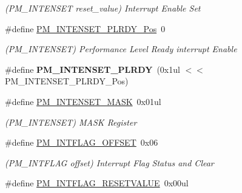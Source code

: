 \begin{DoxyCompactItemize}
\begin{DoxyCompactList}\small\item\em (P\+M\+\_\+\+I\+N\+T\+E\+N\+S\+E\+T reset\+\_\+value) Interrupt Enable Set \end{DoxyCompactList}\item 
\hypertarget{group___s_a_m_l21___p_m_ga31f02b79544243df1c3f79a6ac6d454e}{}\#define \hyperlink{group___s_a_m_l21___p_m_ga31f02b79544243df1c3f79a6ac6d454e}{P\+M\+\_\+\+I\+N\+T\+E\+N\+S\+E\+T\+\_\+\+P\+L\+R\+D\+Y\+\_\+\+Pos}~0\label{group___s_a_m_l21___p_m_ga31f02b79544243df1c3f79a6ac6d454e}

\begin{DoxyCompactList}\small\item\em (P\+M\+\_\+\+I\+N\+T\+E\+N\+S\+E\+T) Performance Level Ready interrupt Enable \end{DoxyCompactList}\item 
\hypertarget{group___s_a_m_l21___p_m_ga6ac005b717082779e5446af2157a9887}{}\#define {\bfseries P\+M\+\_\+\+I\+N\+T\+E\+N\+S\+E\+T\+\_\+\+P\+L\+R\+D\+Y}~(0x1ul $<$$<$ P\+M\+\_\+\+I\+N\+T\+E\+N\+S\+E\+T\+\_\+\+P\+L\+R\+D\+Y\+\_\+\+Pos)\label{group___s_a_m_l21___p_m_ga6ac005b717082779e5446af2157a9887}

\item 
\hypertarget{group___s_a_m_l21___p_m_ga913aa0f4020e344151814557d64767d7}{}\#define \hyperlink{group___s_a_m_l21___p_m_ga913aa0f4020e344151814557d64767d7}{P\+M\+\_\+\+I\+N\+T\+E\+N\+S\+E\+T\+\_\+\+M\+A\+S\+K}~0x01ul\label{group___s_a_m_l21___p_m_ga913aa0f4020e344151814557d64767d7}

\begin{DoxyCompactList}\small\item\em (P\+M\+\_\+\+I\+N\+T\+E\+N\+S\+E\+T) M\+A\+S\+K Register \end{DoxyCompactList}\item 
\hypertarget{group___s_a_m_l21___p_m_ga9f885fcf58926ce0a55a0cb84523b6cc}{}\#define \hyperlink{group___s_a_m_l21___p_m_ga9f885fcf58926ce0a55a0cb84523b6cc}{P\+M\+\_\+\+I\+N\+T\+F\+L\+A\+G\+\_\+\+O\+F\+F\+S\+E\+T}~0x06\label{group___s_a_m_l21___p_m_ga9f885fcf58926ce0a55a0cb84523b6cc}

\begin{DoxyCompactList}\small\item\em (P\+M\+\_\+\+I\+N\+T\+F\+L\+A\+G offset) Interrupt Flag Status and Clear \end{DoxyCompactList}\item 
\hypertarget{group___s_a_m_l21___p_m_ga75ec112ff873ab4855f99087a5023b13}{}\#define \hyperlink{group___s_a_m_l21___p_m_ga75ec112ff873ab4855f99087a5023b13}{P\+M\+\_\+\+I\+N\+T\+F\+L\+A\+G\+\_\+\+R\+E\+S\+E\+T\+V\+A\+L\+U\+E}~0x00ul\label{group___s_a_m_l21___p_m_ga75ec112ff873ab4855f99087a5023b13}


\end{DoxyCompactItemize}
